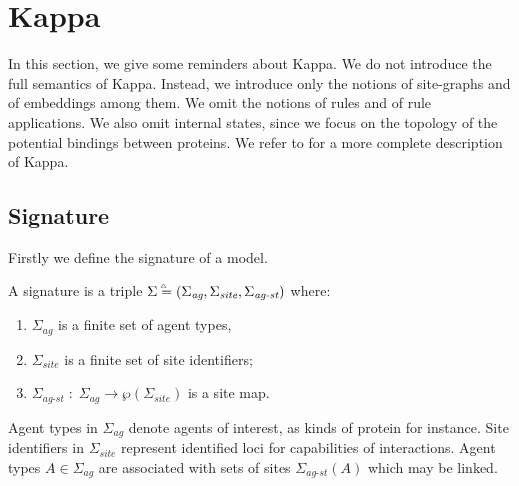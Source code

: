 \documentclass{entcs}
\newcommand{\agentname}{\signaturesymb_{\textit{ag}}}
\newcommand{\sitename}{\signaturesymb_{\textit{site}}}
\newcommand{\linksite}{\signaturesymb_{\textit{ag-st}}}
\newcommand{\signaturesymb}{\Sigma}
\newcommand{\signaturetuple}{(\agentname,\sitename,\linksite)}
\newcommand{\bydef}{\stackrel{\scalebox{0.8}{\!\!$\scriptscriptstyle{\triangle}$}}{=}}
\begin{document}
\section{Kappa}

\label{sec:kappa}

In this section, we give some reminders about Kappa.
We do not introduce the full semantics of Kappa. Instead, we introduce only the notions of site-graphs and of embeddings among them. We omit the notions of rules and of rule applications. We also omit internal states, since we focus on the topology of the potential bindings between proteins.   We refer to \cite{DBLP:journals/tcs/DanosL04,Feret_IJSI2013} for a more complete description of Kappa.

\subsection{Signature}

Firstly we define the signature of a model.
\begin{defn}[signature]
\label{def:signature}
A signature is a triple $\signaturesymb\bydef\signaturetuple$ where: \begin{enumerate}\item $\agentname$ is a finite set of agent types, \item $\sitename$ is a finite set of site identifiers; \item $\linksite\;:\;\agentname \rightarrow \wp(\sitename)$ is a site map.
\end{enumerate}\end{defn}


Agent types in $\agentname$ denote agents of interest, as kinds of protein for instance.
Site identifiers in $\sitename$ represent identified loci for capabilities of interactions.
Agent types $A\in\agentname$ are associated with sets of sites $\linksite(A)$ which may be linked.
\end{document}
